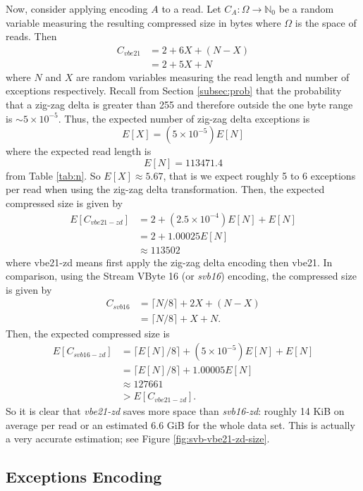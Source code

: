 Now, consider applying encoding $A$ to a read. Let $C_A:\Omega\to\mathbb{N}_0$
be a random variable measuring the resulting compressed size in bytes where
$\Omega$ is the space of reads. Then
\begin{align*}
	C_{vbe21} &= 2 + 6X + (N - X)\\
	&= 2 + 5X + N
\end{align*}
where $N$ and $X$ are random variables measuring the read length and number of
exceptions respectively. Recall from Section \ref{subsec:prob} that the
probability that a zig-zag delta is greater than 255 and therefore outside the one
byte range is $\sim 5\times 10^{-5}$. Thus, the expected number of zig-zag delta
exceptions is
\[ E[X] = (5 \times 10^{-5})E[N] \]
where the expected read length is
\[ E[N] = 113471.4 \]
from Table \ref{tab:n}. So $E[X] \approx 5.67$, that is we expect roughly 5 to 6
exceptions per read when using the zig-zag delta transformation.
Then, the expected compressed size is given by
\begin{align*}
	E[C_{vbe21-zd}] &= 2 + (2.5\times 10^{-4})E[N]+ E[N]\\
	&= 2 + 1.00025E[N]\\
	&\approx 113502
\end{align*}
where vbe21-zd means first apply the zig-zag delta encoding then vbe21. In
comparison, using the Stream VByte 16 (or \textit{svb16}) encoding, the
compressed size is given by
\begin{align*}
	C_{svb16} &= \lceil N/8 \rceil + 2X + (N - X)\\
	&= \lceil N/8 \rceil + X + N.
\end{align*}
Then, the expected compressed size is
\begin{align*}
	E[C_{svb16-zd}] &= \lceil E[N]/8 \rceil + (5 \times 10^{-5})E[N] + E[N]\\
	&= \lceil E[N]/8 \rceil + 1.00005E[N]\\
	&\approx 127661\\
	&> E[C_{vbe21-zd}].
\end{align*}
So it is clear that \textit{vbe21-zd} saves more space than \textit{svb16-zd}:
roughly 14 KiB on average per read or an estimated 6.6 GiB for the whole data
set. This is actually a very accurate estimation; see Figure
\ref{fig:svb-vbe21-zd-size}.



\subsection{Exceptions Encoding}

